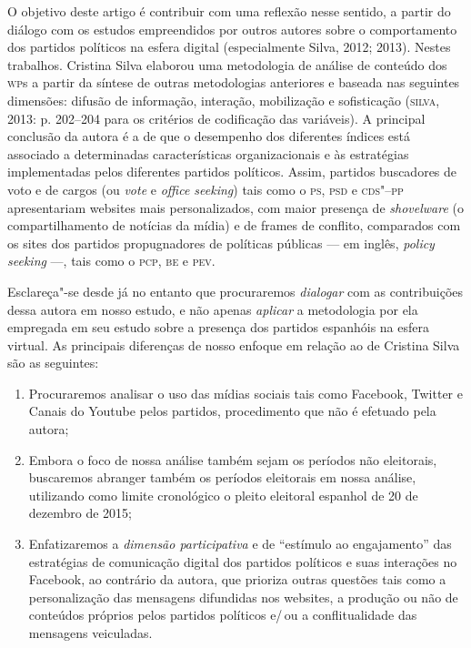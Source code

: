 O objetivo deste artigo é contribuir com uma reflexão nesse sentido, a
partir do diálogo com os estudos empreendidos por outros autores sobre o
comportamento dos partidos políticos na esfera digital (especialmente
Silva, 2012; 2013). Nestes trabalhos. Cristina Silva elaborou uma
metodologia de análise de conteúdo dos \textsc{wp}s a partir da síntese de outras
metodologias anteriores e baseada nas seguintes dimensões: difusão de
informação, interação, mobilização e sofisticação (\textsc{silva}, 2013: p.
202--204 para os critérios de codificação das variáveis). A principal
conclusão da autora é a de que o desempenho dos diferentes índices está
associado a determinadas características organizacionais e às
estratégias implementadas pelos diferentes partidos políticos. Assim,
partidos buscadores de voto e de cargos (ou \textit{vote} e \textit{office seeking}) tais
como o \textsc{ps}, \textsc{psd} e \textsc{cds"--pp} apresentariam websites mais personalizados, com
maior presença de \textit{shovelware} (o compartilhamento de notícias da mídia) e
de frames de conflito, comparados com os sites dos partidos
propugnadores de políticas públicas --- em inglês, \textit{policy seeking} ---, tais como o \textsc{pcp},
\textsc{be} e \textsc{pev}.

Esclareça"-se desde já no entanto que procuraremos \emph{dialogar} com as
contribuições dessa autora em nosso estudo, e não apenas \emph{aplicar}
a metodologia por ela empregada em seu estudo sobre a presença dos
partidos espanhóis na esfera virtual. As principais diferenças de nosso
enfoque em relação ao de Cristina Silva são as seguintes: 

\begin{enumerate}
\item Procuraremos analisar o uso das mídias sociais tais como Facebook,
Twitter e Canais do Youtube pelos partidos, procedimento que não é
efetuado pela autora; 

\item Embora o foco de nossa análise também sejam
os períodos não eleitorais, buscaremos abranger também os períodos
eleitorais em nossa análise, utilizando como limite cronológico o pleito
eleitoral espanhol de 20 de dezembro de 2015; 

\item Enfatizaremos a \emph{dimensão participativa} e de ``estímulo ao engajamento'' das estratégias de comunicação digital dos partidos políticos e suas interações no Facebook, ao contrário da autora, que prioriza outras questões tais como a personalização das mensagens difundidas nos websites, a produção ou não de conteúdos próprios pelos partidos políticos e/\,ou a conflitualidade das mensagens veiculadas.
\end{enumerate}

